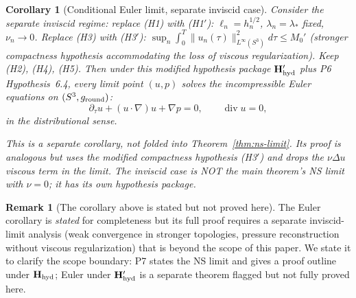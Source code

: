 \documentclass[11pt, a4paper]{amsart}
\newtheorem{corollary}[theorem]{Corollary}
\theoremstyle{definition}
\newtheorem{remark}[theorem]{Remark}
\begin{document}
\begin{corollary}[Conditional Euler limit, separate inviscid case]
\label{cor:euler}
Consider the separate inviscid regime: replace (H1) with
(H1$'$): $\ell_n = h_n^{1/2}$, $\lambda_n = \lambda_\ast$
fixed, $\nu_n \to 0$. Replace (H3) with (H3$'$): $\sup_n \int_0^T
\|u_n(\tau)\|_{L^\infty(S^3)}^2 d\tau \leq M_0'$ (stronger
compactness hypothesis accommodating the loss of viscous
regularization). Keep (H2), (H4), (H5). Then under this modified
hypothesis package $\mathbf H_{\rm hyd}'$ plus P6
Hypothesis~6.4, every limit point $(u, p)$ solves the
incompressible Euler equations on $(S^3, g_{\rm round})$:
\[
  \partial_\tau u + (u \cdot \nabla) u + \nabla p = 0, \qquad
  \operatorname{div} u = 0,
\]
in the distributional sense.

This is a \emph{separate corollary}, not folded into
Theorem~\ref{thm:ns-limit}. Its proof is analogous but uses
the modified compactness hypothesis (H3$'$) and drops the
$\nu \Delta u$ viscous term in the limit. The inviscid case is
NOT the main theorem's NS limit with $\nu = 0$; it has its own
hypothesis package.
\end{corollary}

\begin{remark}[The corollary above is stated but not proved here]
\label{rmk:euler-deferred}
The Euler corollary is \emph{stated} for completeness but its
full proof requires a separate inviscid-limit analysis (weak
convergence in stronger topologies, pressure reconstruction
without viscous regularization) that is beyond the scope of
this paper. We state it to clarify the scope boundary: P7
states the NS limit and gives a proof outline under
$\mathbf H_{\rm hyd}$; Euler under
$\mathbf H_{\rm hyd}'$ is a separate theorem flagged but not
fully proved here.
\end{remark}
\end{document}
